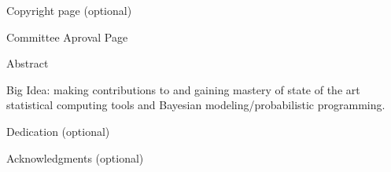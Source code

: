 \thispagestyle{empty}
Copyright page (optional)


\newpage
\thispagestyle{empty}
Committee Aproval Page


\newpage
\setcounter{page}{1} %
Abstract

Big Idea: making contributions to and gaining mastery of state of the art statistical computing tools and Bayesian modeling/probabilistic programming.


\newpage
Dedication (optional)


\newpage
Acknowledgments (optional)

\setcounter{tocdepth}{1}
\tableofcontents

\listoftables

\listoffigures
